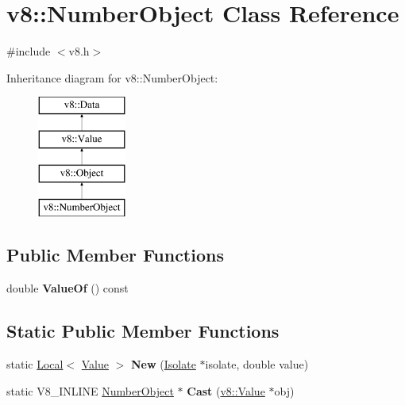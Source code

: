 \hypertarget{classv8_1_1_number_object}{}\section{v8\+:\+:Number\+Object Class Reference}
\label{classv8_1_1_number_object}


{\ttfamily \#include $<$v8.\+h$>$}

Inheritance diagram for v8\+:\+:Number\+Object\+:\begin{figure}[H]
\begin{center}
\leavevmode
\includegraphics[height=4.000000cm]{classv8_1_1_number_object}
\end{center}
\end{figure}
\subsection*{Public Member Functions}
\begin{DoxyCompactItemize}
\item 
double {\bfseries Value\+Of} () const \hypertarget{classv8_1_1_number_object_a40c7211d55bc2de1b23f475d1906b5bf}{}\label{classv8_1_1_number_object_a40c7211d55bc2de1b23f475d1906b5bf}

\end{DoxyCompactItemize}
\subsection*{Static Public Member Functions}
\begin{DoxyCompactItemize}
\item 
static \hyperlink{classv8_1_1_local}{Local}$<$ \hyperlink{classv8_1_1_value}{Value} $>$ {\bfseries New} (\hyperlink{classv8_1_1_isolate}{Isolate} $\ast$isolate, double value)\hypertarget{classv8_1_1_number_object_ad6e3d9fe36d6389fe90f2645cab8a2d7}{}\label{classv8_1_1_number_object_ad6e3d9fe36d6389fe90f2645cab8a2d7}

\item 
static V8\+\_\+\+I\+N\+L\+I\+NE \hyperlink{classv8_1_1_number_object}{Number\+Object} $\ast$ {\bfseries Cast} (\hyperlink{classv8_1_1_value}{v8\+::\+Value} $\ast$obj)\hypertarget{classv8_1_1_number_object_a0dad558fde0ec8e51ff53a3e34dbce7e}{}\label{classv8_1_1_number_object_a0dad558fde0ec8e51ff53a3e34dbce7e}

\end{DoxyCompactItemize}
